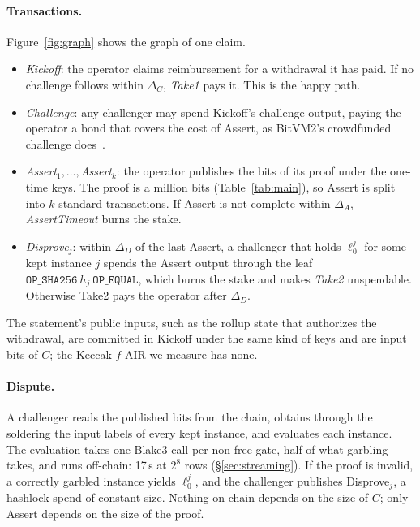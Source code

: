 \documentclass[11pt]{article}
\begin{document}
\paragraph{Transactions.} Figure~\ref{fig:graph} shows the graph of one claim.
\begin{itemize}
  \item \emph{Kickoff}: the operator claims reimbursement for a withdrawal it has
    paid. If no challenge follows within $\Delta_C$, \emph{Take1} pays it. This is
    the happy path.
  \item \emph{Challenge}: any challenger may spend Kickoff's challenge output,
    paying the operator a bond that covers the cost of Assert, as BitVM2's
    crowdfunded challenge does~\cite{laa25bitvm2}.
  \item \emph{Assert$_1,\dots,$Assert$_k$}: the operator publishes the bits of its
    proof under the one-time keys. The proof is a million bits
    (Table~\ref{tab:main}), so Assert is split into $k$ standard transactions. If
    Assert is not complete within $\Delta_A$, \emph{AssertTimeout} burns the stake.
  \item \emph{Disprove$_j$}: within $\Delta_D$ of the last Assert, a challenger that
    holds $\ell^j_0$ for some kept instance $j$ spends the Assert output through the
    leaf $\texttt{OP\_SHA256}\ h_j\ \texttt{OP\_EQUAL}$, which burns the stake and
    makes \emph{Take2} unspendable. Otherwise Take2 pays the operator after
    $\Delta_D$.
\end{itemize}
The statement's public inputs, such as the rollup state that authorizes the
withdrawal, are committed in Kickoff under the same kind of keys and are input
bits of $C$; the Keccak-$f$ AIR we measure has none.

\paragraph{Dispute.} A challenger reads the published bits from the chain,
obtains through the soldering the input labels of every kept instance, and
evaluates each instance. The evaluation takes one Blake3 call per non-free gate,
half of what garbling takes, and runs off-chain: 17\,s at $2^8$ rows
(\S\ref{sec:streaming}). If the proof is invalid, a correctly garbled
instance yields $\ell^j_0$, and the challenger publishes Disprove$_j$, a hashlock
spend of constant size. Nothing on-chain depends on the size of $C$; only Assert
depends on the size of the proof.
\end{document}
